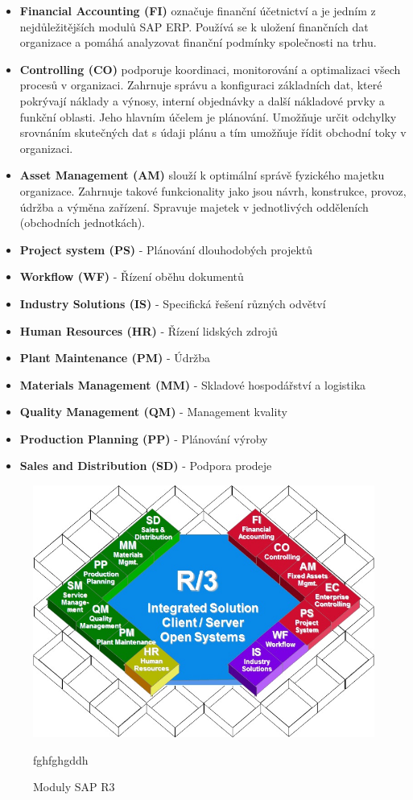 \documentclass[thesis=M,czech]{FITthesis}[2012/06/26]
\begin{document}
\begin{itemize}
	\item
	\textbf{Financial Accounting (FI)} označuje finanční účetnictví a je jedním z nejdůležitějších modulů SAP ERP. Používá se k uložení finančních dat organizace a pomáhá analyzovat finanční podmínky společnosti na trhu.
	\item
	\textbf{Controlling (CO)} podporuje koordinaci, monitorování a optimalizaci všech procesů v organizaci. Zahrnuje správu a konfiguraci základních dat, které pokrývají náklady a výnosy, interní objednávky a další nákladové prvky a funkční oblasti. Jeho hlavním účelem je plánování. Umožňuje určit odchylky srovnáním skutečných dat s údaji plánu a tím umožňuje řídit obchodní toky v organizaci.
	\item
	\textbf{Asset Management (AM)} slouží k optimální správě fyzického majetku organizace. Zahrnuje takové funkcionality jako jsou návrh, konstrukce, provoz, údržba a výměna zařízení. Spravuje majetek v jednotlivých odděleních (obchodních jednotkách).
	\item
	\textbf{Project system (PS)} - Plánování dlouhodobých projektů
	\item
	\textbf{Workflow (WF)} - Řízení oběhu dokumentů
	\item
	\textbf{Industry Solutions (IS)} - Specifická řešení různých odvětví
	\item
	\textbf{Human Resources (HR)} - Řízení lidských zdrojů  
	\item
	\textbf{Plant Maintenance (PM)} - Údržba
	\item
	\textbf{Materials Management (MM)} - Skladové hospodářství a logistika
	\item
	\textbf{Quality Management (QM)} - Management kvality
	\item
	\textbf{Production Planning (PP)} - Plánování výroby 
	\item
	\textbf{Sales and Distribution (SD)} - Podpora prodeje   
\end{itemize} 	

\begin{figure}[H]
	\centering
	\includegraphics[width=1\textwidth]{images/sap_r3.jpg}
	\caption{Moduly SAP R3}
	\label{img:sapr3}
	\small
	fghfghgddh
\end{figure}
\end{document}
